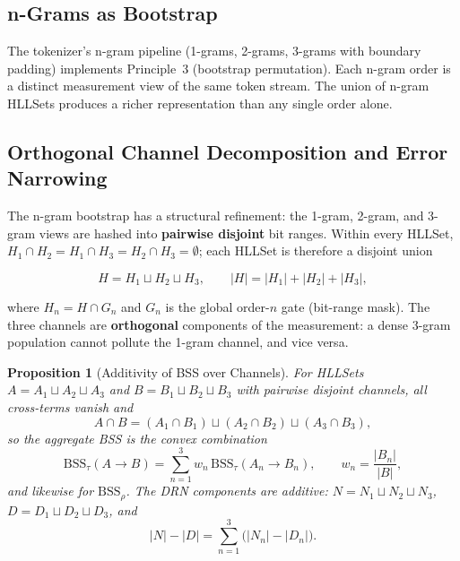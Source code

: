 \documentclass[11pt,a4paper]{article}
\newtheorem{proposition}{Proposition}[section]
\theoremstyle{remark}
\begin{document}
\subsection{n-Grams as Bootstrap}

The tokenizer's n-gram pipeline (1-grams, 2-grams, 3-grams with boundary padding)
implements Principle~3 (bootstrap permutation). Each n-gram order is a distinct
measurement view of the same token stream. The union of n-gram HLLSets produces a richer
representation than any single order alone.

\subsection{Orthogonal Channel Decomposition and Error Narrowing}
\label{sec:channels}

The n-gram bootstrap has a structural refinement: the 1-gram, 2-gram, and
3-gram views are hashed into \textbf{pairwise disjoint} bit ranges. Within
every HLLSet, $H_1 \cap H_2 = H_1 \cap H_3 = H_2 \cap H_3 = \emptyset$; each
HLLSet is therefore a disjoint union

\begin{equation}
  H = H_1 \sqcup H_2 \sqcup H_3, \qquad |H| = |H_1| + |H_2| + |H_3|,
\end{equation}

where $H_n = H \cap G_n$ and $G_n$ is the global order-$n$ gate (bit-range
mask). The three channels are \textbf{orthogonal} components of the
measurement: a dense 3-gram population cannot pollute the 1-gram channel, and
vice versa.

\begin{proposition}[Additivity of BSS over Channels]
\label{prop:channel-bss}
For HLLSets $A = A_1 \sqcup A_2 \sqcup A_3$ and
$B = B_1 \sqcup B_2 \sqcup B_3$ with pairwise disjoint channels, all
cross-terms vanish and
\begin{equation}
  A \cap B = (A_1 \cap B_1) \sqcup (A_2 \cap B_2) \sqcup (A_3 \cap B_3),
\end{equation}
so the aggregate BSS is the convex combination
\begin{equation}
  \text{BSS}_{\tau}(A \to B) = \sum_{n=1}^{3} w_n\,
  \text{BSS}_{\tau}(A_n \to B_n), \qquad w_n = \frac{|B_n|}{|B|},
\end{equation}
and likewise for $\text{BSS}_{\rho}$. The DRN components are additive:
$N = N_1 \sqcup N_2 \sqcup N_3$, $D = D_1 \sqcup D_2 \sqcup D_3$, and
\begin{equation}
  |N| - |D| = \sum_{n=1}^{3} \bigl(|N_n| - |D_n|\bigr).
\end{equation}
\end{proposition}
\end{document}

